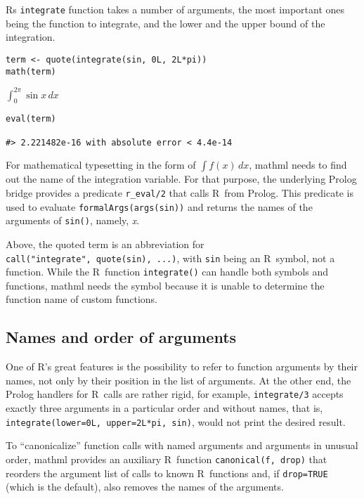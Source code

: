 Rs \texttt{integrate} function takes a number of arguments, the most important
ones being the function to integrate, and the lower and the upper bound
of the integration.

\begin{verbatim}
term <- quote(integrate(sin, 0L, 2L*pi))
math(term)
\end{verbatim}

\(\int_{0}^{{2}{{}}{\pi}}{\sin{x}}\,{d{x}}\)

\begin{verbatim}
eval(term)

#> 2.221482e-16 with absolute error < 4.4e-14
\end{verbatim}

For mathematical typesetting in the form of \(\int f(x)\, dx\), mathml
needs to find out the name of the integration variable. For that
purpose, the underlying Prolog bridge provides a predicate \texttt{r\_eval/2}
that calls R~from Prolog. This predicate is used to evaluate
\texttt{formalArgs(args(sin))} and returns the names of the arguments of
\texttt{sin()}, namely, \emph{x}.

Above, the quoted term is an abbreviation for \texttt{call("integrate",~quote(sin),~...)},
with \texttt{sin} being an R~symbol, not a function. While the R~function
\texttt{integrate()} can handle both symbols and functions, mathml needs the
symbol because it is unable to determine the function name of custom
functions.

\hypertarget{names-and-order-of-arguments}{%
\subsection{Names and order of arguments}\label{names-and-order-of-arguments}}

One of R's great features is the possibility to refer to function
arguments by their names, not only by their position in the list of
arguments. At the other end, the Prolog handlers for R~calls are rather
rigid, for example, \texttt{integrate/3} accepts exactly three arguments in a
particular order and without names, that is,
\texttt{integrate(lower=0L,~upper=2L*pi,~sin)}, would not print the desired
result.

To ``canonicalize'' function calls with named arguments and arguments in
unusual order, mathml provides an auxiliary R~function
\texttt{canonical(f,~drop)} that reorders the argument list of calls to known
R~functions and, if \texttt{drop=TRUE} (which is the default), also removes the
names of the arguments.

